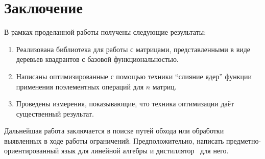 
\section*{Заключение}
В рамках проделанной работы получены следующие результаты:
\begin{enumerate}
    \item Реализована библиотека для работы с матрицами, представленными в виде деревьев квадрантов с базовой функциональностью.
    \item Написаны оптимизированные с помощью техники \enquote{слияние ядер} функции применения поэлементных операций для $n$ матриц.
    \item Проведены измерения, показывающие, что техника оптимизации даёт существенный результат.
\end{enumerate}
Дальнейшая работа заключается в поиске путей обхода или обработки выявленных в ходе работы ограничений. Предположительно, написать предметно-ориентированный язык для линейной алгебры и дистиллятор~\cite{distillation} для него.
